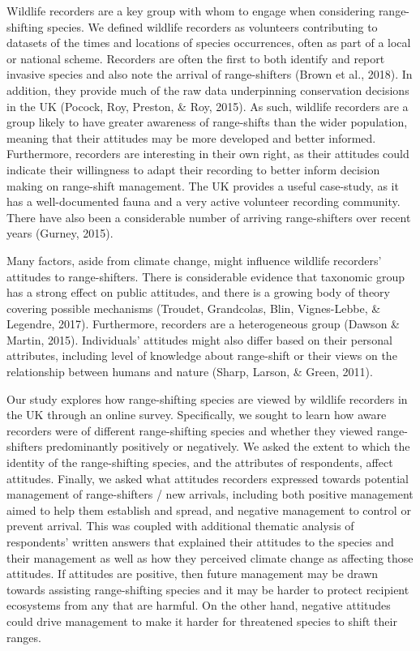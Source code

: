 \documentclass[
]{article}
\begin{document}
Wildlife recorders are a key group with whom to engage when considering
range-shifting species. We defined wildlife recorders as volunteers
contributing to datasets of the times and locations of species
occurrences, often as part of a local or national scheme. Recorders are
often the first to both identify and report invasive species and also
note the arrival of range-shifters (Brown et al., 2018). In addition,
they provide much of the raw data underpinning conservation decisions in
the UK (Pocock, Roy, Preston, \& Roy, 2015). As such, wildlife recorders
are a group likely to have greater awareness of range-shifts than the
wider population, meaning that their attitudes may be more developed and
better informed. Furthermore, recorders are interesting in their own
right, as their attitudes could indicate their willingness to adapt
their recording to better inform decision making on range-shift
management. The UK provides a useful case-study, as it has a
well-documented fauna and a very active volunteer recording community.
There have also been a considerable number of arriving range-shifters
over recent years (Gurney, 2015).

Many factors, aside from climate change, might influence wildlife
recorders' attitudes to range-shifters. There is considerable evidence
that taxonomic group has a strong effect on public attitudes, and there
is a growing body of theory covering possible mechanisms (Troudet,
Grandcolas, Blin, Vignes-Lebbe, \& Legendre, 2017). Furthermore,
recorders are a heterogeneous group (Dawson \& Martin, 2015).
Individuals' attitudes might also differ based on their personal
attributes, including level of knowledge about range-shift or their
views on the relationship between humans and nature (Sharp, Larson, \&
Green, 2011).

Our study explores how range-shifting species are viewed by wildlife
recorders in the UK through an online survey. Specifically, we sought to
learn how aware recorders were of different range-shifting species and
whether they viewed range-shifters predominantly positively or
negatively. We asked the extent to which the identity of the
range-shifting species, and the attributes of respondents, affect
attitudes. Finally, we asked what attitudes recorders expressed towards
potential management of range-shifters / new arrivals, including both
positive management aimed to help them establish and spread, and
negative management to control or prevent arrival. This was coupled with
additional thematic analysis of respondents' written answers that
explained their attitudes to the species and their management as well as
how they perceived climate change as affecting those attitudes. If
attitudes are positive, then future management may be drawn towards
assisting range-shifting species and it may be harder to protect
recipient ecosystems from any that are harmful. On the other hand,
negative attitudes could drive management to make it harder for
threatened species to shift their ranges.
\end{document}
